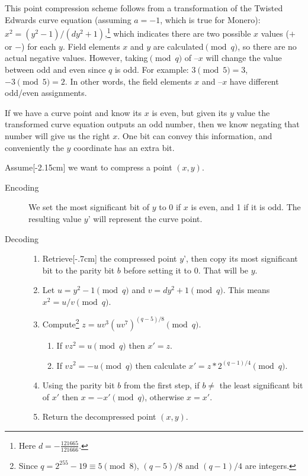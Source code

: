 This point compression scheme follows from a transformation of the Twisted Edwards curve equation (assuming $a = -1$, which is true for Monero): $x^2 = (y^2-1)/(d y^2+1)$,\footnote{Here $d = - \frac{121665}{121666}$.} which indicates there are two possible $x$ values ($+$ or $-$) for each $y$. Field elements $x$ and $y$ are calculated$\pmod{q}$, so there are no actual negative values. However, taking$\pmod{q}$ of $–x$ will change the value between odd and even since $q$ is odd. For example: $3 \pmod{5} = 3$, $-3 \pmod{5} = 2$. In other words, the field elements $x$ and $–x$ have different odd/even assignments.

If we have a curve point and know its $x$ is even, but given its $y$ value the transformed curve equation outputs an odd number, then we know negating that number will give us the right $x$. One bit can convey this information, and conveniently the $y$ coordinate has an extra bit.

Assume[-2.15cm] we want to compress a point \((x, y)\).

\begin{description}
	\item[Encoding] We set the most significant bit of $y$ to 0 if $x$ is even, and 1 if it is odd. The resulting value $y’$ will represent the curve point.
	
	\item[Decoding] \hfill
	    \begin{enumerate}
    	    \item Retrieve[-.7cm] the compressed point $y’$, then copy its most significant bit to the parity bit $b$ before setting it to 0. That will be $y$.
    	    \item Let \(u = y^2-1 \pmod q\) and \(v = d y^2  + 1 \pmod q\). This means $x^2 = u/v \pmod q$.
    	    \item Compute\footnote{Since $q = 2^{255}-19 \equiv 5 \pmod{8}$, $(q-5)/8$ and $(q-1)/4$ are integers.} \(z = u v^3 (u v^7)^{(q-5)/8} \pmod q\).
            \begin{enumerate}
                \item If \(v z^2 = u \pmod q\) then \(x' = z\).
                \item If \(v z^2 = -u \pmod q\) then calculate \(x' = z*2^{(q-1)/4} \pmod q\).
            \end{enumerate}
            \item Using the parity bit \(b\) from the first step, if $b \ne$ the least significant bit of $x'$ then  \(x = -x' \pmod q\), otherwise \(x = x'\).
            \item Return the decompressed point $(x,y)$.
	    \end{enumerate}
\end{description}

